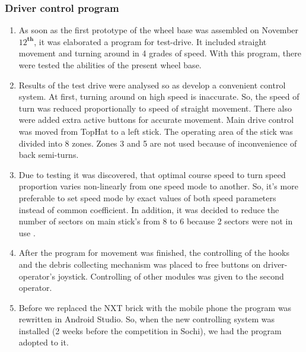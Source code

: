 \subsubsection{Driver control program}
	
	\begin{enumerate}
	    \item As soon as the first prototype of the wheel base was assembled on November $12^\textbf{th}$, it was elaborated a program for test-drive. It included straight movement and turning around in 4 grades of speed. With this program, there were tested the abilities of the present wheel base. 
	    
	    \item Results of the test drive were analysed so as develop a convenient control system. At first, turning around on high speed is inaccurate. So, the speed of turn was reduced proportionally to speed of straight movement. There also were added extra active buttons for accurate movement. Main drive control was moved from TopHat to a left stick. The operating area of the stick was divided into 8 zones. Zones 3 and 5 %
	    are not used because of inconvenience of back semi-turns. 
	    
	    \item Due to testing it was discovered, that optimal course speed to turn speed proportion varies non-linearly from one speed mode to another. So, it's more preferable to set speed mode by exact values of both speed parameters instead of common coefficient. In addition, it was decided to reduce the number of sectors on main stick's from 8 to 6 because 2 sectors were not in use %
	    .
	    
	    \item After the program for movement was finished, the controlling of the hooks and the debris collecting mechanism was placed to free buttons on driver-operator's joystick. Controlling of other modules was given to the second operator.
	    
        \item Before we replaced the NXT brick with the mobile phone the program was rewritten in Android Studio. So, when the new controlling system was installed (2 weeks before the competition in Sochi), we had the program adopted to it.
  \end{enumerate}
  
  
\fillpage
